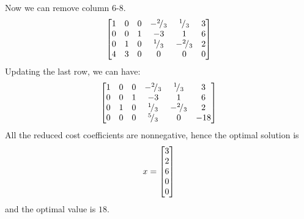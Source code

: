 \documentclass{article}
\newcommand*\rfrac[2]{{}^{#1}\!/_{#2}}
\begin{document}
Now we can remove column 6-8. 
\begin{align*}
\bmat{1& 0 & 0 & -\rfrac{2}{3} & \rfrac{1}{3} & 3 \\
0 & 0 & 1 & -3 & 1 & 6 \\
0 & 1 & 0 & \rfrac{1}{3} & -\rfrac{2}{3} & 2 \\
4 & 3 & 0 & 0 & 0 & 0 \\}
\end{align*} 
Updating the last row, we can have: \\
\begin{align*} 
\bmat{1& 0 & 0 & -\rfrac{2}{3} & \rfrac{1}{3} & 3 \\
0 & 0 & 1 & -3 & 1 & 6 \\
0 & 1 & 0 & \rfrac{1}{3} & -\rfrac{2}{3} & 2 \\
0 & 0 & 0 & \rfrac{5}{3} & 0 & -18 \\}
\end{align*}
All the reduced cost coefficients are nonnegative, hence the optimal solution is \begin{align*} 
x = \begin{bmatrix} 3 \\ 2\\ 6\\ 0\\ 0 \end{bmatrix}  \end{align*} 
and the optimal value is $18$. 

\hypertarget{}{}
\end{document}
